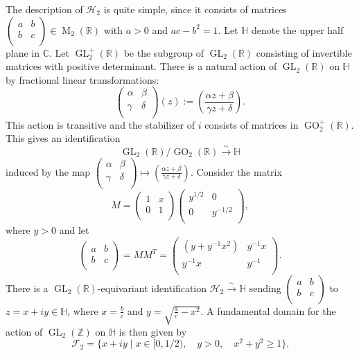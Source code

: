 \documentclass[table]{amsart}
\newcommand{\cF}{\mathcal{F}}
\newcommand{\cH}{\mathcal{H}}
\newcommand{\Z}{\mathbb{Z}}
\newcommand{\op}[1]{\operatorname{#1}}
\newcommand\mtx[4] { \left( {\begin{array}{cc}
 #1 & #2 \\
 #3 & #4 \\
 \end{array} } \right)}
\numberwithin{equation}{section}
\begin{document}
\par The description of $\cH_2$ is quite simple, since it consists of matrices $\mtx{a}{b}{b}{c}\in \op{M}_2(\mathbb{R})$ with $a>0$ and $ac-b^2=1$. Let $\mathbb{H}$ denote the upper half plane in $\mathbb{C}$. Let $\op{GL}_2^+(\mathbb{R})$ be the subgroup of $\op{GL}_2(\mathbb{R})$ consisting of invertible matrices with positive determinant. There is a natural action of $\op{GL}_2(\mathbb{R})$ on $\mathbb{H}$ by fractional linear transformations:
\[\mtx{\alpha}{\beta}{\gamma}{\delta}(z):=\left(\frac{\alpha z+\beta}{\gamma z+\delta}\right).\] This action is transitive and the stabilizer of $i$ consists of matrices in $\op{GO}_2^+(\mathbb{R})$. This gives an identification 
\[\op{GL}_2(\mathbb{R})/\op{GO}_2(\mathbb{R})\xrightarrow{\sim}\mathbb{H}\] induced by the map $\mtx{\alpha}{\beta}{\gamma}{\delta}\mapsto \left(\frac{\alpha z+\beta}{\gamma z+\delta}\right)$. Consider the matrix
\[M=\mtx{1}{x}{0}{1}\mtx{y^{1/2}}{0}{0}{y^{-1/2}},\] where $y>0$ and let 
\[\mtx{a}{b}{b}{c}=MM^T=\mtx{(y+y^{-1}x^2)}{y^{-1}x}{y^{-1}x}{y^{-1}}.\]
\noindent There is a $\op{GL}_2(\mathbb{R})$-equivariant identification $\cH_2\xrightarrow{\sim} \mathbb{H}$ sending $\mtx{a}{b}{b}{c}$ to $z=x+iy\in \mathbb{H}$, where $x=\frac{b}{c}$ and $y=\sqrt{\frac{a}{c}-x^2}$. A fundamental domain for the action of $\op{GL}_2(\Z)$ on $\mathbb{H}$ is then given by \[\cF_2=\{x+iy\mid x\in [0, 1/2), \quad y>0, \quad x^2+y^2\geq 1\}.\] %




\end{document}
